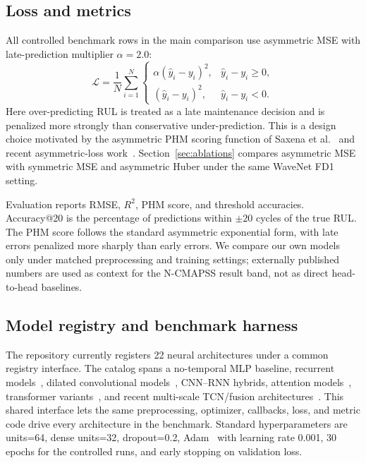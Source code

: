 \subsection{Loss and metrics}

All controlled benchmark rows in the main comparison use asymmetric MSE with late-prediction multiplier $\alpha=2.0$:
\begin{equation}
\mathcal{L} =
\frac{1}{N}\sum_{i=1}^{N}
\begin{cases}
\alpha(\hat{y}_i-y_i)^2, & \hat{y}_i-y_i \ge 0,\\
(\hat{y}_i-y_i)^2, & \hat{y}_i-y_i < 0.
\end{cases}
\end{equation}
Here over-predicting RUL is treated as a late maintenance decision and is penalized more strongly than conservative under-prediction. This is a design choice motivated by the asymmetric PHM scoring function of Saxena et al.~\cite{saxena2008damage} and recent asymmetric-loss work~\cite{mpm2024loss}. Section~\ref{sec:ablations} compares asymmetric MSE with symmetric MSE and asymmetric Huber under the same WaveNet FD1 setting.

Evaluation reports RMSE, $R^2$, PHM score, and threshold accuracies. Accuracy@20 is the percentage of predictions within $\pm20$ cycles of the true RUL. The PHM score follows the standard asymmetric exponential form, with late errors penalized more sharply than early errors. We compare our own models only under matched preprocessing and training settings; externally published numbers are used as context for the N-CMAPSS result band, not as direct head-to-head baselines.

\subsection{Model registry and benchmark harness}

The repository currently registers 22 neural architectures under a common registry interface. The catalog spans a no-temporal MLP baseline, recurrent models~\cite{hochreiter1997lstm,cho2014gru}, dilated convolutional models~\cite{bai2018tcn,oord2016wavenet}, CNN--RNN hybrids, attention models~\cite{vaswani2017attention}, transformer variants~\cite{fan2024star}, and recent multi-scale TCN/fusion architectures~\cite{ttsnet2025,xu2024msattn}. This shared interface lets the same preprocessing, optimizer, callbacks, loss, and metric code drive every architecture in the benchmark. Standard hyperparameters are units=64, dense units=32, dropout=0.2, Adam~\cite{kingma2015adam} with learning rate 0.001, 30 epochs for the controlled runs, and early stopping on validation loss.

